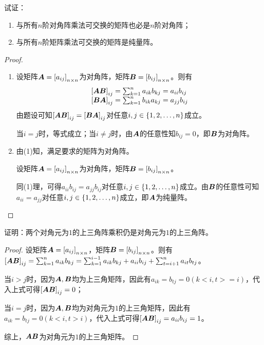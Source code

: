 \begin{problem}\label{problem-1.10}
试证：
\begin{enumerate}
    \item 与所有\(n\)阶对角阵乘法可交换的矩阵也必是\(n\)阶对角阵；
    \item 与所有\(n\)阶矩阵乘法可交换的矩阵是纯量阵。
\end{enumerate}
\end{problem}
\begin{proof}
    \begin{enumerate}
        \item
              {
              设矩阵\(\boldsymbol{A}=\left[ a_{ij} \right]_{n\times n}\)为对角阵，矩阵\(\boldsymbol{B}=\left[ b_{ij} \right]_{n\times n}\)。则有
              \begin{equation*}
                  \begin{array}{lll}
                      \left[ \boldsymbol{A}\boldsymbol{B} \right]_{ij}=\sum_{k=1}^na_{ik}b_{kj}=a_{ii}b_{ij} \\
                      \left[ \boldsymbol{B}\boldsymbol{A} \right]_{ij}=\sum_{k=1}^nb_{ik}a_{kj}=a_{jj}b_{ij}
                  \end{array}
              \end{equation*}
              由题设可知\(\left[ \boldsymbol{A}\boldsymbol{B} \right]_{ij}=\left[ \boldsymbol{B}\boldsymbol{A} \right]_{ij}\)对任意\(i,j\in\left\{1,2,\dots,n \right\}\)成立。

              当\(i=j\)时，等式成立；当\(i\neq j\)时，由\(\boldsymbol{A}\)的任意性知\(b_{ij}=0\)，即\(\boldsymbol{B}\)为对角阵。
              }
        \item
              {
              由(1)知，满足要求的矩阵为对角阵。

              设矩阵\(\boldsymbol{A}=\left[ a_{ij} \right]_{n\times n}\)为对角阵，矩阵\(\boldsymbol{B}=\left[ b_{ij} \right]_{n\times n}\)。

              同(1)理，可得\(a_{ii}b_{ij}=a_{jj}b_{ij}\)对任意\(i,j\in\left\{1,2,\dots,n \right\}\)成立。由\(\boldsymbol{B}\)的任意性可知\(a_{ii}=a_{jj}\)对任意\(i,j\in\left\{1,2,\dots,n \right\}\)成立，即\(\boldsymbol{A}\)为纯量阵。
              }
    \end{enumerate}
\end{proof}

\begin{problem}\label{problem-1.11}
证明：两个对角元为\(1\)的上三角阵乘积仍是对角元为\(1\)的上三角阵。
\end{problem}
\begin{proof}
    设矩阵\(\boldsymbol{A}=\left[ a_{ij} \right]_{n\times n}\)，矩阵\(\boldsymbol{B}=\left[ b_{ij} \right]_{n\times n}\)。则有\(\left[ \boldsymbol{A}\boldsymbol{B} \right]_{ij}=\sum_{k=1}^na_{ik}b_{kj}=\sum_{k=1}^{i-1}a_{ik}b_{kj}+a_{ii}b_{ij}+\sum_{t=i+1}^na_{it}b_{tj}\)。

    当\(i>j\)时，因为\(\boldsymbol{A},\boldsymbol{B}\)均为上三角矩阵，因此有\(a_{ik}=b_{tj}=0(k<i,t>=i)\)，代入上式可得\(\left[ \boldsymbol{A}\boldsymbol{B} \right]_{ij}=0\)；

    当\(i=j\)时，因为\(\boldsymbol{A},\boldsymbol{B}\)均为对角元为\(1\)的上三角矩阵，因此有\(a_{ik}=b_{tj}=0(k<i,t>i)\)，代入上式可得\(\left[ \boldsymbol{A}\boldsymbol{B} \right]_{ij}=a_{ii}b_{ij}=1\)。

    综上，\(\boldsymbol{A}\boldsymbol{B}\)为对角元为\(1\)的上三角矩阵。
\end{proof}

